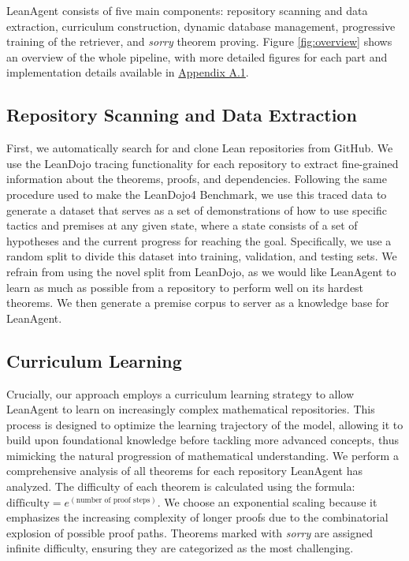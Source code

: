 \documentclass{article} %
\begin{document}
LeanAgent consists of five main components: repository scanning and data extraction, curriculum construction, dynamic database management, progressive training of the retriever, and \textit{sorry} theorem proving. Figure \ref{fig:overview} shows an overview of the whole pipeline, with more detailed figures for each part and implementation details available in \hyperref[sec:implementation_details]{Appendix A.1}.

\subsection{Repository Scanning and Data Extraction}

First, we automatically search for and clone Lean repositories from GitHub. We use the LeanDojo tracing functionality for each repository to extract fine-grained information about the theorems, proofs, and dependencies. Following the same procedure used to make the LeanDojo4 Benchmark, we use this traced data to generate a dataset that serves as a set of demonstrations of how to use specific tactics and premises at any given state, where a state consists of a set of hypotheses and the current progress for reaching the goal. Specifically, we use a random split to divide this dataset into training, validation, and testing sets. We refrain from using the novel split from LeanDojo, as we would like LeanAgent to learn as much as possible from a repository to perform well on its hardest theorems. We then generate a premise corpus to server as a knowledge base for LeanAgent.

\subsection{Curriculum Learning}

Crucially, our approach employs a curriculum learning strategy to allow LeanAgent to learn on increasingly complex mathematical repositories. This process is designed to optimize the learning trajectory of the model, allowing it to build upon foundational knowledge before tackling more advanced concepts, thus mimicking the natural progression of mathematical understanding. We perform a comprehensive analysis of all theorems for each repository LeanAgent has analyzed. The difficulty of each theorem is calculated using the formula: $\text{difficulty} = e^{(\text{number of proof steps})}$. We choose an exponential scaling because it emphasizes the increasing complexity of longer proofs due to the combinatorial explosion of possible proof paths. Theorems marked with \textit{sorry} are assigned infinite difficulty, ensuring they are categorized as the most challenging.
\end{document}
